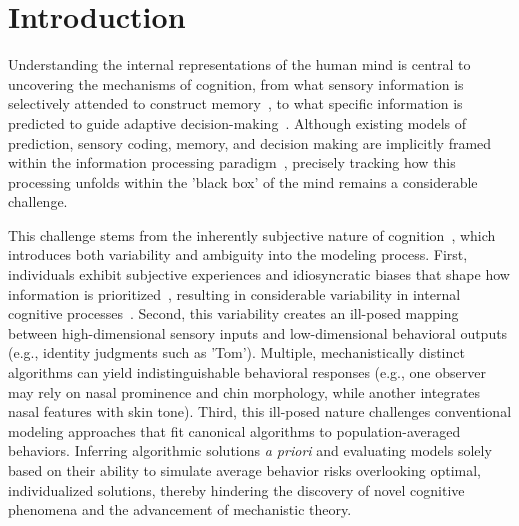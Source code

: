 \section{Introduction}
\label{sec:intro}

Understanding the internal representations of the human mind is central to uncovering the mechanisms of cognition, from what sensory information is selectively attended to construct memory~\cite{zhan2019modelling}, to what specific information is predicted to guide adaptive decision-making~\cite{friston2009predictive,clark2013whatever,yan2023network}. Although existing models of prediction, sensory coding, memory, and decision making are implicitly framed within the information processing paradigm~\cite{marr2010vision}, precisely tracking how this processing unfolds within the 'black box' of the mind remains a considerable challenge. 

This challenge stems from the inherently subjective nature of cognition~\cite{boogert2018measuring}, which introduces both variability and ambiguity into the modeling process. First, individuals exhibit subjective experiences and idiosyncratic biases that shape how information is prioritized~\cite{zhan2021modeling}, resulting in considerable variability in internal cognitive processes~\cite{stanovich2008individual}. Second, this variability creates an ill-posed mapping between high-dimensional sensory inputs and low-dimensional behavioral outputs (e.g., identity judgments such as 'Tom'). Multiple, mechanistically distinct algorithms can yield indistinguishable behavioral responses (e.g., one observer may rely on nasal prominence and chin morphology, while another integrates nasal features with skin tone). Third, this ill-posed nature challenges conventional modeling approaches that fit canonical algorithms to population-averaged behaviors. Inferring algorithmic solutions \textit{a priori} and evaluating models solely based on their ability to simulate average behavior risks overlooking optimal, individualized solutions, thereby hindering the discovery of novel cognitive phenomena and the advancement of mechanistic theory.

